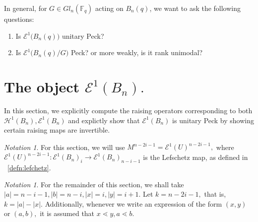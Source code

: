 \documentclass[10 pt]{amsart}
\theoremstyle{plain}
\theoremstyle{definition}
\theoremstyle{remark}
\numberwithin{equation}{section}
\theoremstyle{remark}
\newtheorem{note}[thm]{Notation}
\newcommand\BF{{\mathbb F}}
\begin{document}
In general, for $G \in Gl_n(\BF_q)$ acting on $B_n(q)$, we want to ask the following questions:

\begin{enumerate}
\item Is $\mathcal E^1 \big(B_n(q)\big)$ unitary Peck? 
\item Is $\mathcal E^1 \big(B_n(q) /G\big)$ Peck? or more weakly, is it rank unimodal?
\end{enumerate}



\section{The object $\mathcal E^1(B_n).$}
\label{sec:unitary_peck_f}
In this section, we explicitly compute the raising operators corresponding to both $\mathcal H^1(B_n),\mathcal E^1(B_n)$ and explictly show that $\mathcal E^1(B_n)$ is unitary Peck by showing certain raising maps are invertible.

\begin{note}
For this section, we will use $M^{n-2i-1} = \mathcal E^1(U)^{n-2i-1},$ where $\mathcal E^1(U)^{n-2i-1}:\mathcal E^1(B_n)_i \rightarrow \mathcal E^1(B_n)_{n-i-1}$ is the Lefschetz map, as defined in ~\ref{defn:lefchetz}.
\end{note}
\begin{note}
For the remainder of this section, we shall take $|a| = n-i-1,|b|= n-i,|x| = i,|y| = i+1.$ Let $k = n-2i-1,$ that is, $k = |a| - |x|.$ Additionally, whenever we write an expression of the form $(x, y)$ or $(a, b),$ it is assumed that $x \lessdot y,a \lessdot b.$
\end{note}
\end{document}
